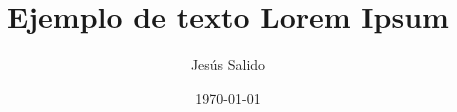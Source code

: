 \documentclass[twocolumn,10pt]{article}
\title{Ejemplo de texto Lorem Ipsum}
\author{Jesús Salido}
\date{\today}
\begin{document}
\maketitle	


\Blinddocument 
	
\end{document}
